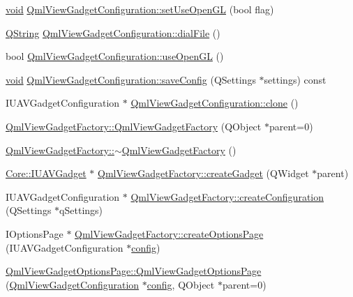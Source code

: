 \begin{DoxyCompactItemize}
\item 
\hyperlink{group___u_a_v_objects_plugin_ga444cf2ff3f0ecbe028adce838d373f5c}{void} \hyperlink{group___o_p_map_plugin_ga9613450d5753ab06673c80b0d137cbe8}{Qml\-View\-Gadget\-Configuration\-::set\-Use\-Open\-G\-L} (bool flag)
\item 
\hyperlink{group___u_a_v_objects_plugin_gab9d252f49c333c94a72f97ce3105a32d}{Q\-String} \hyperlink{group___o_p_map_plugin_ga797d73a96488915da65e8cd79ceac1fe}{Qml\-View\-Gadget\-Configuration\-::dial\-File} ()
\item 
bool \hyperlink{group___o_p_map_plugin_ga64a5c04c8b5ac9f81ebeb1e573c1d1c7}{Qml\-View\-Gadget\-Configuration\-::use\-Open\-G\-L} ()
\item 
\hyperlink{group___u_a_v_objects_plugin_ga444cf2ff3f0ecbe028adce838d373f5c}{void} \hyperlink{group___o_p_map_plugin_gada9019ef4d25aa0e87788713af1d1d72}{Qml\-View\-Gadget\-Configuration\-::save\-Config} (Q\-Settings $\ast$settings) const 
\item 
I\-U\-A\-V\-Gadget\-Configuration $\ast$ \hyperlink{group___o_p_map_plugin_gab4f87dbc27b19e319ea02819e3574853}{Qml\-View\-Gadget\-Configuration\-::clone} ()
\item 
\hyperlink{group___o_p_map_plugin_ga84b7aa224d691ff4283bf3201a8f3b5e}{Qml\-View\-Gadget\-Factory\-::\-Qml\-View\-Gadget\-Factory} (Q\-Object $\ast$parent=0)
\item 
\hyperlink{group___o_p_map_plugin_ga2ae87f4b2a912a2e38fe69c6b8b3e3e7}{Qml\-View\-Gadget\-Factory\-::$\sim$\-Qml\-View\-Gadget\-Factory} ()
\item 
\hyperlink{class_core_1_1_i_u_a_v_gadget}{Core\-::\-I\-U\-A\-V\-Gadget} $\ast$ \hyperlink{group___o_p_map_plugin_gadceaaa6e9f968a951f33f6c1a7de1340}{Qml\-View\-Gadget\-Factory\-::create\-Gadget} (Q\-Widget $\ast$parent)
\item 
I\-U\-A\-V\-Gadget\-Configuration $\ast$ \hyperlink{group___o_p_map_plugin_ga9000c14dd19e5dbc8e5c8e2ed26b2553}{Qml\-View\-Gadget\-Factory\-::create\-Configuration} (Q\-Settings $\ast$q\-Settings)
\item 
I\-Options\-Page $\ast$ \hyperlink{group___o_p_map_plugin_gab0af6f5774c846fe82b1b073cf0bbb76}{Qml\-View\-Gadget\-Factory\-::create\-Options\-Page} (I\-U\-A\-V\-Gadget\-Configuration $\ast$\hyperlink{deflate_8c_a4473b5227787415097004fd39f55185e}{config})
\item 
\hyperlink{group___o_p_map_plugin_gaf6860d14e2ae756100a2765d50a6d9b0}{Qml\-View\-Gadget\-Options\-Page\-::\-Qml\-View\-Gadget\-Options\-Page} (\hyperlink{class_qml_view_gadget_configuration}{Qml\-View\-Gadget\-Configuration} $\ast$\hyperlink{deflate_8c_a4473b5227787415097004fd39f55185e}{config}, Q\-Object $\ast$parent=0)

\end{DoxyCompactItemize}
